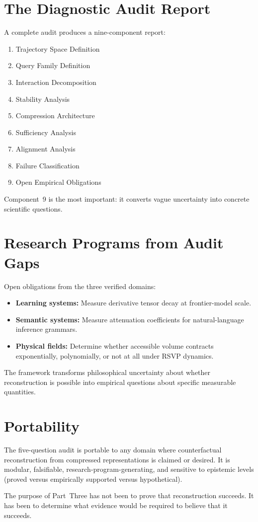 \section{The Diagnostic Audit Report}

A complete audit produces a nine-component report:
\begin{enumerate}
  \item Trajectory Space Definition
  \item Query Family Definition
  \item Interaction Decomposition
  \item Stability Analysis
  \item Compression Architecture
  \item Sufficiency Analysis
  \item Alignment Analysis
  \item Failure Classification
  \item Open Empirical Obligations
\end{enumerate}

Component~9 is the most important: it converts vague uncertainty into concrete scientific questions.

\section{Research Programs from Audit Gaps}

Open obligations from the three verified domains:
\begin{itemize}
  \item \textbf{Learning systems:} Measure derivative tensor decay at frontier-model scale.
  \item \textbf{Semantic systems:} Measure attenuation coefficients for natural-language inference grammars.
  \item \textbf{Physical fields:} Determine whether accessible volume contracts exponentially, polynomially, or not at all under RSVP dynamics.
\end{itemize}

The framework transforms philosophical uncertainty about whether reconstruction is possible into empirical questions about specific measurable quantities.

\section{Portability}

The five-question audit is portable to any domain where counterfactual reconstruction from compressed representations is claimed or desired. It is modular, falsifiable, research-program-generating, and sensitive to epistemic levels (proved versus empirically supported versus hypothetical).

The purpose of Part~Three has not been to prove that reconstruction succeeds. It has been to determine what evidence would be required to believe that it succeeds.
